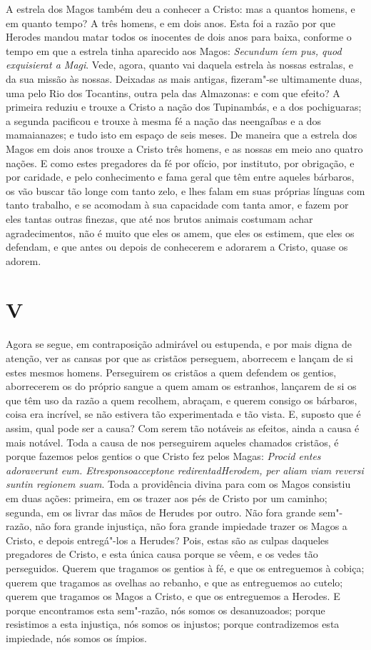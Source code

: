 A estrela dos Magos também deu a conhecer a Cristo: mas a quantos
homens, e em quanto tempo? A três homens, e em dois anos. Esta foi a
razão por que Herodes mandou matar todos os inocentes de dois anos para
baixa, conforme o tempo em que a estrela tinha aparecido aos Magos:
\emph{Secundum íem pus, quod exquisierat a Magi}.
Vede, agora, quanto vai daquela estrela às nossas estralas, e da sua
missão às nossas. Deixadas as mais antigas, fizeram"-se ultimamente duas,
uma pelo Rio dos Tocantins, outra pela das Almazonas: e com que efeito?
A primeira reduziu e trouxe a Cristo a nação dos Tupinambás, e a dos
pochiguaras; a segunda pacificou e trouxe à mesma fé a nação das
neengaíbas e a dos mamaianazes; e tudo isto em espaço de seis meses. De
maneira que a estrela dos Magos em dois anos trouxe a Cristo três
homens, e as nossas em meio ano quatro nações. E como estes pregadores
da fé por ofício, por instituto, por obrigação, e por caridade, e pelo
conhecimento e fama geral que têm entre aqueles bárbaros, os vão buscar
tão longe com tanto zelo, e lhes falam em suas próprias línguas com
tanto trabalho, e se acomodam à sua capacidade com tanta amor, e fazem
por eles tantas outras finezas, que até nos brutos animais costumam
achar agradecimentos, não é muito que eles os amem, que eles os estimem,
que eles os defendam, e que antes ou depois de conhecerem e adorarem a
Cristo, quase os adorem.

\section{V}

Agora se segue, em contraposição admirável ou estupenda, e por mais
digna de atenção, ver as cansas por que as cristãos perseguem,
aborrecem e lançam de si estes mesmos homens. Perseguirem os cristãos a
quem defendem os gentios, aborrecerem os do próprio sangue a quem amam
os estranhos, lançarem de si os que têm uso da razão a quem recolhem,
abraçam, e querem consigo os bárbaros, coisa era incrível, se não
estivera tão experimentada e tão vista. E, suposto que é assim, qual
pode ser a causa? Com serem tão notáveis as efeitos, ainda a causa é
mais notável. Toda a causa de nos perseguirem aqueles chamados cristãos,
é porque fazemos pelos gentios o que Cristo fez pelos Magas:
\emph{Procid entes adoraverunt eum. Etresponsoacceptone
redirentadHerodem, per aliam viam reversi suntin regionem suam}.
 Toda a providência divina para com os Magos consistiu em
duas ações: primeira, em os trazer aos pés de Cristo por um caminho;
segunda, em os livrar das mãos de Herudes por outro. Não fora grande
sem"-razão, não fora grande injustiça, não fora grande impiedade trazer
os Magos a Cristo, e depois entregá"-los a Herudes? Pois, estas são as
culpas daqueles pregadores de Cristo, e esta única causa porque se vêem,
e os vedes tão perseguidos. Querem que tragamos os gentios à fé, e que
os entreguemos à cobiça; querem que tragamos as ovelhas ao rebanho, e
que as entreguemos ao cutelo; querem que tragamos os Magos a Cristo, e
que os entreguemos a Herodes. E porque encontramos esta sem"-razão, nós
somos os desanuzoados; porque resistimos a esta injustiça, nós somos os
injustos; porque contradizemos esta impiedade, nós somos os ímpios.

